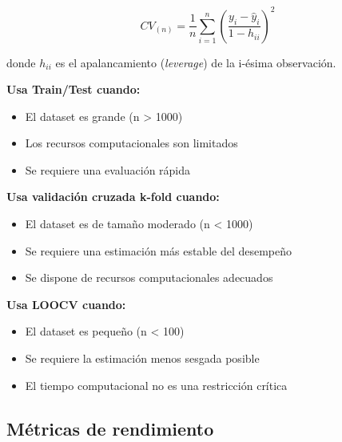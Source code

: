 \documentclass[
  letterpaper,
  DIV=11,
  numbers=noendperiod]{scrreprt}
\providecommand{\tightlist}{%
  \setlength{\itemsep}{0pt}\setlength{\parskip}{0pt}}
\begin{document}
\[CV_{(n)} = \frac{1}{n}\sum_{i=1}^{n}\left(\frac{y_i - \hat{y}_i}{1-h_{ii}}\right)^2\]

donde \(h_{ii}\) es el apalancamiento (\emph{leverage}) de la i-ésima
observación.

\begin{tcolorbox}[enhanced jigsaw, leftrule=.75mm, breakable, colbacktitle=quarto-callout-important-color!10!white, bottomrule=.15mm, colframe=quarto-callout-important-color-frame, toprule=.15mm, colback=white, coltitle=black, bottomtitle=1mm, left=2mm, title=\textcolor{quarto-callout-important-color}{\faExclamation}\hspace{0.5em}{Guía para seleccionar estrategia de validación}, opacityback=0, arc=.35mm, opacitybacktitle=0.6, toptitle=1mm, titlerule=0mm, rightrule=.15mm]

\textbf{Usa Train/Test cuando:}

\begin{itemize}
\tightlist
\item
  El dataset es grande (n \textgreater{} 1000)
\item
  Los recursos computacionales son limitados\\
\item
  Se requiere una evaluación rápida
\end{itemize}

\textbf{Usa validación cruzada k-fold cuando:}

\begin{itemize}
\tightlist
\item
  El dataset es de tamaño moderado (n \textless{} 1000)
\item
  Se requiere una estimación más estable del desempeño
\item
  Se dispone de recursos computacionales adecuados
\end{itemize}

\textbf{Usa LOOCV cuando:}

\begin{itemize}
\tightlist
\item
  El dataset es pequeño (n \textless{} 100)
\item
  Se requiere la estimación menos sesgada posible
\item
  El tiempo computacional no es una restricción crítica
\end{itemize}

\end{tcolorbox}

\subsection{Métricas de rendimiento}\label{muxe9tricas-de-rendimiento}
\end{document}
